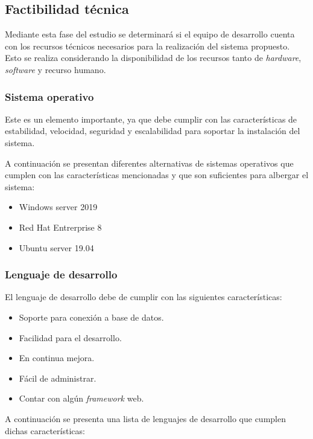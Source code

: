 \subsection{Factibilidad técnica}

Mediante esta fase del estudio se determinará si el equipo de desarrollo cuenta con los recursos técnicos necesarios para la realización del sistema propuesto. Esto se realiza considerando la disponibilidad de los recursos tanto de \textit{hardware}, \textit{software} y recurso humano.

\subsubsection{Sistema operativo}

Este es un elemento importante, ya que debe cumplir con las características de estabilidad, velocidad, seguridad y escalabilidad para soportar la instalación del sistema.


A continuación se presentan diferentes alternativas de sistemas operativos que cumplen con las características mencionadas y que son suficientes para albergar el sistema:

\begin{itemize}
    \item Windows server 2019
    \item Red Hat Entrerprise 8
    \item Ubuntu server 19.04
\end{itemize}

\subsubsection{Lenguaje de desarrollo}

El lenguaje de desarrollo debe de cumplir con las siguientes características:

\begin{itemize}
    \item Soporte para conexión a base de datos.
    \item Facilidad para el desarrollo.
    \item En continua mejora.
    \item Fácil de administrar.
    \item Contar con algún \textit{framework} web.
\end{itemize}

A continuación se presenta una lista de lenguajes de desarrollo que cumplen dichas características:

